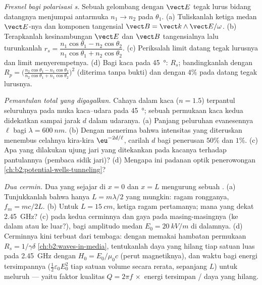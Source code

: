 \begin{exercise}[$\star\star\star$]\label{exo:b2:wave-interfaces:10}
\emph{Fresnel bagi polarisasi s.} Sebuah gelombang dengan $\vect E$ tegak lurus
bidang datangnya menjumpai antarmuka $n_1 \to n_2$ pada $\theta_1$.
(a) Tuliskanlah ketiga medan $\vect E$-nya dan komponen tangensial
$\vect B = \vect k\wedge\vect E/\omega$. (b) Terapkanlah kesinambungan
$\vect E$ dan $\vect B$ tangensialnya lalu turunkanlah $r_s = \dfrac{n_1\cos\theta_1 - n_2\cos\theta_2}
{n_1\cos\theta_1 + n_2\cos\theta_2}$. (c) Periksalah limit datang tegak lurusnya dan
limit menyerempetnya. (d) Bagi kaca pada \qty{45}{\degree}: $R_s$; bandingkanlah dengan $R_p
= \bigl(\frac{n_2\cos\theta_1 - n_1\cos\theta_2}{n_2\cos\theta_1 + n_1\cos\theta_2}\bigr)^2$
(diterima tanpa bukti) dan dengan $4\%$ pada datang tegak lurusnya.
\end{exercise}

\begin{exercise}[$\star\star\star$]\label{exo:b2:wave-interfaces:11}
\emph{Pemantulan total yang digagalkan.} Cahaya dalam kaca ($n = 1.5$)
terpantul seluruhnya pada muka kaca--udara pada \qty{45}{\degree}; sebuah permukaan kaca
kedua didekatkan sampai jarak $d$ dalam udaranya. (a) Panjang peluruhan
evanesennya $\ell$ bagi $\lambda = \qty{600}{nm}$. (b) Dengan menerima bahwa intensitas
yang diteruskan menembus celahnya kira-kira $\eu^{-2d/\ell}$, carilah $d$ bagi penerusan $50\%$
dan $1\%$. (c) Apa yang dilakukan ujung jari yang ditekankan pada kacanya
terhadap pantulannya (pembaca sidik jari)? (d) Mengapa ini padanan
optik penerowongan
\cref{ch:b2:potential-wells-tunneling}?
\end{exercise}

\begin{exercise}[$\star\star\star$]\label{exo:b2:wave-interfaces:12}
\emph{Dua cermin.} Dua  yang sejajar di $x = 0$ dan $x =
L$ mengurung sebuah . (a) Tunjukkanlah bahwa hanya $L = m\lambda/2$ yang mungkin:
ragam rongganya, $f_m = mc/2L$. (b) Untuk $L = \qty{15}{cm}$, ketiga ragam
pertamanya; mana yang dekat \qty{2.45}{GHz}? (c)  pada kedua
cerminnya dan gaya pada masing-masingnya (ke dalam atau ke luar?), bagi amplitudo
medan $E_0 = \qty{20}{kV/m}$ di dalamnya. (d) Cerminnya kini terbuat dari tembaga:
dengan memakai hambatan permukaan $R_s = 1/\gamma\delta$
\cref{ch:b2:waves-in-media}, tentukanlah daya yang hilang tiap satuan luas pada
\qty{2.45}{GHz} dengan $H_0 = E_0/\mu_0c$ (perut magnetiknya), dan waktu bagi energi tersimpannya
($\tfrac12\varepsilon_0E_0^2$ tiap satuan volume secara rerata, sepanjang $L$) untuk
meluruh --- yaitu faktor kualitas $Q = 2\pi f\,\times$ energi tersimpan / daya yang hilang.
\end{exercise}

